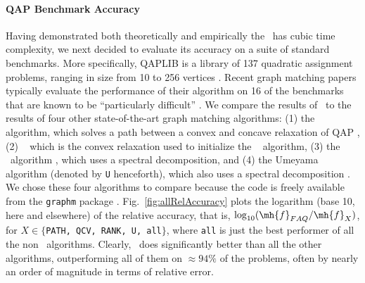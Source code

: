 \documentclass{article} %
\begin{document}
\vspace{-5pt}
\paragraph{QAP Benchmark Accuracy} %
\label{sub:qap_benchmarks}

Having demonstrated both theoretically and empirically the \FAQ\  has cubic time complexity, we next decided to evaluate its accuracy on a suite of standard benchmarks.  More specifically, QAPLIB is a library of 137 quadratic assignment problems, ranging in size from 10 to 256 vertices \cite{Burkard1997}.  Recent graph matching papers typically evaluate the performance of their algorithm on 16 of the benchmarks that are known to be ``particularly difficult'' \cite{Zaslavskiy2009}.  We compare the results of \FAQ\  to the results of four other state-of-the-art graph matching algorithms: (1) the \Path~ algorithm, which solves a path between a convex and concave relaxation of QAP \cite{Zaslavskiy2009}, (2) \Qcv~ which is the convex relaxation used to initialize the \Path~ algorithm, (3) the \Rank~algorithm \cite{Singh2007}, which uses a spectral decomposition, and (4)  the Umeyama algorithm (denoted by \texttt{U} henceforth), which also uses a spectral decomposition \cite{Umeyama1988}.  We chose these four algorithms to compare because the code is freely available from the \texttt{graphm} package \cite{Zaslavskiy2009}.  
Fig.\ \ref{fig:allRelAccuracy} plots the logarithm (base 10, here and elsewhere) of the relative accuracy, that is, $\log_{10}(\mh{f}_{FAQ}/\mh{f}_X)$, for $X \in \{$\texttt{PATH, QCV, RANK, U, all}$\}$, where \texttt{all} is just the best performer of all the non \FAQ\  algorithms.  Clearly, \FAQ\  does significantly better than all the other algorithms, outperforming all of them on $\approx 94\%$ of the problems, often by nearly an order of magnitude in terms of relative error.
\end{document}
